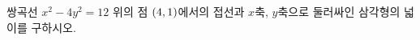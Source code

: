 쌍곡선 $x^2-4y^2=12$ 위의 점 $(4{,}\mkern3mu\mathopen{}1)$에서의 접선과 $x$축, \mbox{$y$축으로} 둘러싸인 삼각형의 넓이를 구하시오.
